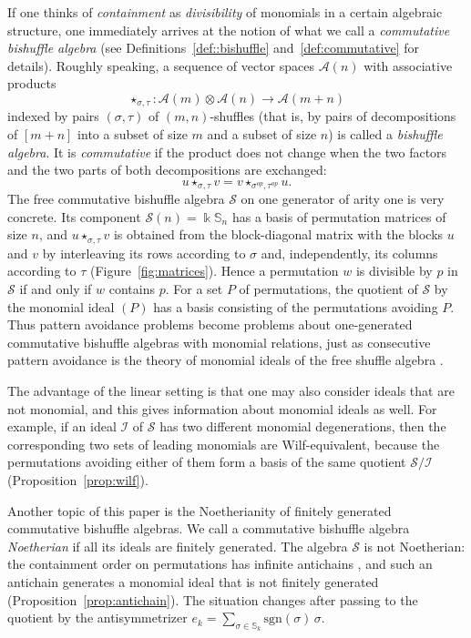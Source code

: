 \documentclass[11pt]{amsart}
\theoremstyle{definition}
\theoremstyle{remark}
\newcommand{\bS}{\mathbb{S}}
\newcommand{\kk}{\Bbbk}
\newcommand{\sgn}{\mathrm{sgn}}
\newcommand{\cA}{\mathscr{A}}
\newcommand{\cI}{\mathscr{I}}
\newcommand{\cS}{\mathscr{S}}
\begin{document}
If one thinks of {\it containment} as {\it divisibility} of monomials in a certain algebraic structure, one immediately arrives at the notion of what we call a \emph{commutative bishuffle algebra} (see Definitions~\ref{def::bishuffle} and~\ref{def:commutative} for details).
Roughly speaking, a sequence of vector spaces $\cA(n)$ with associative products
\[
\star_{\sigma,\tau}\colon\cA(m)\otimes\cA(n)\to\cA(m+n)
\]
indexed by pairs $(\sigma,\tau)$ of $(m,n)$-shuffles (that is, by pairs of decompositions of $[m+n]$ into a subset of size $m$ and a subset of size $n$) is called a \emph{bishuffle algebra}. It is \emph{commutative} if the product does not change when the two factors and the two parts of both decompositions are exchanged:
\[
u\star_{\sigma,\tau}v=v\star_{\sigma^{op},\tau^{op}}u.
\]
The free commutative bishuffle algebra $\cS$ on one generator of arity one is very concrete. Its component $\cS(n)=\kk\bS_n$ has a basis of permutation matrices of size $n$, and $u\star_{\sigma,\tau}v$ is obtained from the block-diagonal matrix with the blocks $u$ and $v$ by interleaving its rows according to $\sigma$ and, independently, its columns according to $\tau$ (Figure~\ref{fig:matrices}). Hence a permutation $w$ is divisible by $p$ in $\cS$ if and only if $w$ contains $p$. For a set $P$ of permutations, the quotient of $\cS$ by the monomial ideal $(P)$ has a basis consisting of the permutations avoiding $P$. Thus pattern avoidance problems become problems about one-generated commutative bishuffle algebras with monomial relations, just as consecutive pattern avoidance is the theory of monomial ideals of the free shuffle algebra \cite{DK}.

The advantage of the linear setting is that one may also consider ideals that are not monomial, and this gives information about monomial ideals as well.
For example, if an ideal $\cI$ of $\cS$ has two different monomial degenerations, then the corresponding two sets of leading monomials are Wilf-equivalent, because the permutations avoiding either of them form a basis of the same quotient $\cS/\cI$ (Proposition~\ref{prop:wilf}).

Another topic of this paper is the Noetherianity of finitely generated commutative bishuffle algebras.
We call a commutative bishuffle algebra \emph{Noetherian} if all its ideals are finitely generated. The algebra $\cS$ is not Noetherian: the containment order on permutations has infinite antichains \cite{SB,AMR,Vatter}, and such an antichain generates a monomial ideal that is not finitely generated (Proposition~\ref{prop:antichain}). The situation changes after passing to the quotient by the antisymmetrizer $e_k=\sum_{\sigma\in\bS_k}\sgn(\sigma)\,\sigma$.
\end{document}
